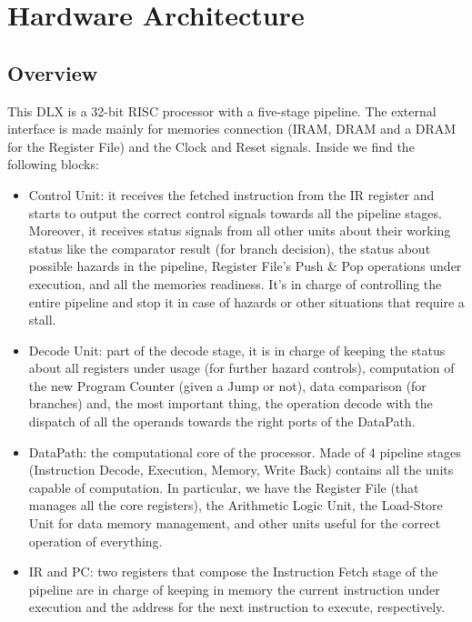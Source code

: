 \chapter{Hardware Architecture}

\section{Overview}

This DLX is a 32-bit RISC processor with a five-stage pipeline. The external interface is made mainly for memories connection (IRAM, DRAM and a DRAM for the Register File) and the Clock and Reset signals. Inside we find the following blocks:

\begin{itemize}
    \item Control Unit: it receives the fetched instruction from the IR register and starts to output the correct control signals towards all the pipeline stages. Moreover, it receives status signals from all other units about their working status like the comparator result (for branch decision), the status about possible hazards in the pipeline, Register File's Push \& Pop operations under execution, and all the memories readiness. It's in charge of controlling the entire pipeline and stop it in case of hazards or other situations that require a stall.
    \item Decode Unit: part of the decode stage, it is in charge of keeping the status about all registers under usage (for further hazard controls), computation of the new Program Counter (given a Jump or not), data comparison (for branches) and, the most important thing, the operation decode with the dispatch of all the operands towards the right ports of the DataPath.
    \item DataPath: the computational core of the processor. Made of 4 pipeline stages (Instruction Decode, Execution, Memory, Write Back) contains all the units capable of computation. In particular, we have the Register File (that manages all the core registers), the Arithmetic Logic Unit, the Load-Store Unit for data memory management, and other units useful for the correct operation of everything.
    \item IR and PC: two registers that compose the Instruction Fetch stage of the pipeline are in charge of keeping in memory the current instruction under execution and the address for the next instruction to execute, respectively. 
\end{itemize}


